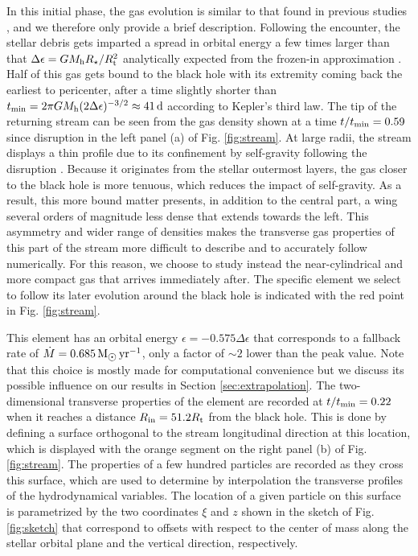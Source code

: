 \documentclass[a4paper,fleqn,usenatbib]{mnras}
\newcommand{\rstar}{R_{\star}}
\newcommand{\rt}{R_{\rm t}}
\newcommand{\mdot}{\dot{M}}
\newcommand{\mh}{M_{\rm h}}
\newcommand{\tmin}{t_{\rm min}}
\def\days{\, \rm d}
\def\msunperyr{\, \rm \mathrm{M}_{\hbox{$\odot$}} \, {yr}^{-1}}
\begin{document}
In this initial phase, the gas evolution is similar to that found in previous studies \citep{lodato2009,guillochon2013,guillochon2014-10jh,coughlin2015-variability}, and we therefore only provide a brief description. Following the encounter, the stellar debris gets imparted a spread in orbital energy a few times larger than that $\Delta \epsilon = G \mh \rstar / \rt^2$ analytically expected from the frozen-in approximation \citep{stone2013}. Half of this gas gets bound to the black hole with its extremity coming back the earliest to pericenter, after a time slightly shorter than $\tmin = 2 \pi G \mh (2 \Delta \epsilon)^{-3/2} \approx 41 \days$ according to Kepler's third law. The tip of the returning stream can be seen from the gas density shown at a time $t/\tmin = 0.59$ since disruption in the left panel (a) of Fig. \ref{fig:stream}. At large radii, the stream displays a thin profile due to its confinement by self-gravity following the disruption \citep{kochanek1994,coughlin2016-structure}. Because it originates from the stellar outermost layers, the gas closer to the black hole is more tenuous, which reduces the impact of self-gravity. As a result, this more bound matter presents, in addition to the central part, a wing several orders of magnitude less dense that extends towards the left. This asymmetry and wider range of densities makes the transverse gas properties of this part of the stream more difficult to describe and to accurately follow numerically. For this reason, we choose to study instead the near-cylindrical and more compact gas that arrives immediately after. The specific element we select to follow its later evolution around the black hole is indicated with the red point in Fig. \ref{fig:stream}.

This element has an orbital energy $\epsilon = -0.575 \Delta \epsilon$ that corresponds to a fallback rate of $\mdot = 0.685 \msunperyr$, only a factor of $\sim 2$ lower than the peak value. Note that this choice is mostly made for computational convenience but we discuss its possible influence on our results in Section \ref{sec:extrapolation}. The two-dimensional transverse properties of the element are recorded at $t / \tmin = 0.22$ when it reaches a distance $R_{\rm in} = 51.2 \rt$ from the black hole. This is done by  defining a surface orthogonal to the stream longitudinal direction at this location, which is displayed with the orange segment on the right panel (b) of Fig. \ref{fig:stream}. The properties of a few hundred particles are recorded as they cross this surface, which are used to determine by interpolation the transverse profiles of the hydrodynamical variables. The location of a given particle on this surface is parametrized by the two coordinates $\xi$ and $z$ shown in the sketch of Fig. \ref{fig:sketch} that correspond to offsets with respect to the center of mass along the stellar orbital plane and the vertical direction, respectively.
\end{document}
